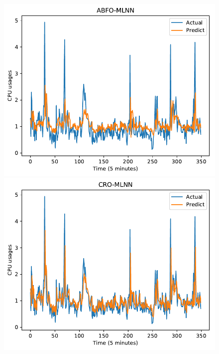 \documentclass[11pt,twoside]{article}
\begin{document}
\begin{multicols}{2}
\begin{figure}[!ht]
    \begin{minipage}[b]{0.33\linewidth}
    \centering
    \includegraphics[width=0.9\linewidth]{images/pdf/predict/k2/cpu_k2_abfo_mlnn.pdf} 
  \end{minipage}
  \begin{minipage}[b]{0.33\linewidth}
    \centering
    \includegraphics[width=0.9\linewidth]{images/pdf/predict/k2/cpu_k2_cro_mlnn.pdf} 
  \end{minipage} 
  \begin{minipage}[b]{0.33\linewidth}
    \centering

\end{minipage}
\end{figure}
\end{multicols}
\end{document}
